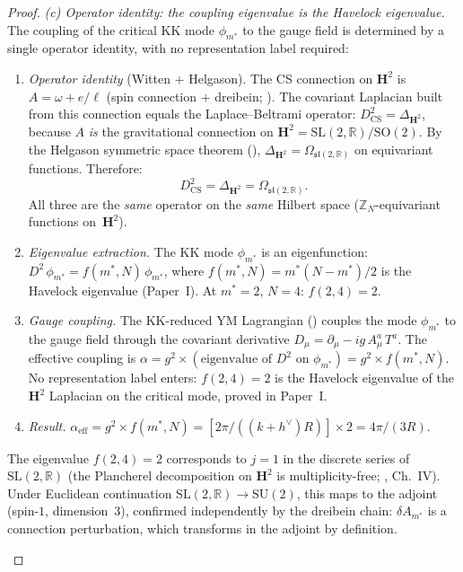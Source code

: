 \begin{proof}
\emph{(c) Operator identity: the coupling eigenvalue
is the Havelock eigenvalue.}
The coupling of the critical KK mode $\phi_{m^*}$ to the
gauge field is determined by a single operator identity,
with no representation label required:
\begin{enumerate}
\item \emph{Operator identity} (Witten $+$ Helgason).
  The CS connection on $\mathbf{H}^2$ is
  $A = \omega + e/\ell$
  (spin connection $+$ dreibein; \citealt{Witten1988}).
  The covariant Laplacian built from this connection
  equals the Laplace--Beltrami operator:
  $D^2_{\mathrm{CS}} = \Delta_{\mathbf{H}^2}$,
  because $A$ \emph{is} the gravitational connection on
  $\mathbf{H}^2 = \mathrm{SL}(2,\mathbb{R})/\mathrm{SO}(2)$.
  By the Helgason symmetric space theorem
  (\citealt{Helgason1984}),
  $\Delta_{\mathbf{H}^2} = \Omega_{\mathfrak{sl}(2,\mathbb{R})}$
  on equivariant functions.
  Therefore:
  \begin{equation}\label{eq:operator-identity}
    D^2_{\mathrm{CS}}
    = \Delta_{\mathbf{H}^2}
    = \Omega_{\mathfrak{sl}(2,\mathbb{R})}.
  \end{equation}
  All three are the \emph{same} operator on the
  \emph{same} Hilbert space
  ($\mathbb{Z}_N$-equivariant functions on~$\mathbf{H}^2$).
\item \emph{Eigenvalue extraction.}
  The KK mode $\phi_{m^*}$ is an eigenfunction:
  $D^2\,\phi_{m^*} = f(m^*,N)\,\phi_{m^*}$,
  where $f(m^*,N) = m^*(N{-}m^*)/2$ is the
  Havelock eigenvalue (Paper~I).
  At $m^* = 2$, $N = 4$: $f(2,4) = 2$.
\item \emph{Gauge coupling.}
  The KK-reduced YM Lagrangian
  (\citealt{BlauThompson1993}) couples the mode
  $\phi_{m^*}$ to the gauge field through
  the covariant derivative
  $D_\mu = \partial_\mu - ig\,A^a_\mu\,T^a$.
  The effective coupling is
  $\alpha = g^2 \times (\text{eigenvalue of } D^2
  \text{ on } \phi_{m^*}) = g^2 \times f(m^*,N)$.
  No representation label enters:
  $f(2,4) = 2$ is the Havelock eigenvalue of the
  $\mathbf{H}^2$ Laplacian on the critical mode,
  proved in Paper~I.
\item \emph{Result.}
  $\alpha_{\mathrm{eff}} = g^2 \times f(m^*,N)
  = [2\pi/((k{+}h^\vee)R)] \times 2 = 4\pi/(3R)$.
\end{enumerate}

\begin{remark}
\label{rmk:wzw-bound}
The eigenvalue $f(2,4) = 2$ corresponds to $j = 1$
in the discrete series of $\mathrm{SL}(2,\mathbb{R})$
(the Plancherel decomposition on $\mathbf{H}^2$ is
multiplicity-free; \citealt{Helgason1984}, Ch.~IV).
Under Euclidean continuation
$\mathrm{SL}(2,\mathbb{R}) \to \mathrm{SU}(2)$,
this maps to the adjoint (spin-$1$, dimension~$3$),
confirmed independently by the dreibein chain:
$\delta A_{m^*}$ is a connection perturbation,
which transforms in the adjoint by definition.


\end{remark}
\end{proof}
